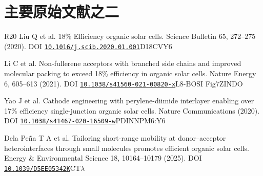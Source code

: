 \medskip
\FloatBarrier
\Needspace{110pt}
\section{{\cjkfont 主要原始文献之二}\allowbreak{}}\label{sec:62}
\begin{thebibliography}{R20}
 Liu Q et al. 18\% Efficiency organic solar cells. Science Bulletin 65, 272–275 (2020). DOI \href{https://doi.org/10.1016/j.scib.2020.01.001}{\nolinkurl{10.1016/j.scib.2020.01.001}}\allowbreak{}D18\allowbreak{}CV\allowbreak{}Y6\allowbreak{}
\par
 Li C et al. Non-fullerene acceptors with branched side chains and improved molecular packing to exceed 18\% efficiency in organic solar cells. Nature Energy 6, 605–613 (2021). DOI \href{https://doi.org/10.1038/s41560-021-00820-x}{\nolinkurl{10.1038/s41560-021-00820-x}}\allowbreak{}L8-BO\allowbreak{}SI Fig7\allowbreak{}ZINDO\allowbreak{}
\par
 Yao J et al. Cathode engineering with perylene-diimide interlayer enabling over 17\% efficiency single-junction organic solar cells. Nature Communications (2020). DOI \href{https://doi.org/10.1038/s41467-020-16509-w}{\nolinkurl{10.1038/s41467-020-16509-w}}\allowbreak{}PDINN\allowbreak{}PM6:Y6\allowbreak{}
\par
 Dela Peña T A et al. Tailoring short-range mobility at donor–acceptor heterointerfaces through small molecules promotes efficient organic solar cells. Energy \& Environmental Science 18, 10164–10179 (2025). DOI \href{https://doi.org/10.1039/D5EE05342K}{\nolinkurl{10.1039/D5EE05342K}}\allowbreak{}CT\allowbreak{}\ensuremath{\lambda}\allowbreak{}

\end{thebibliography}
